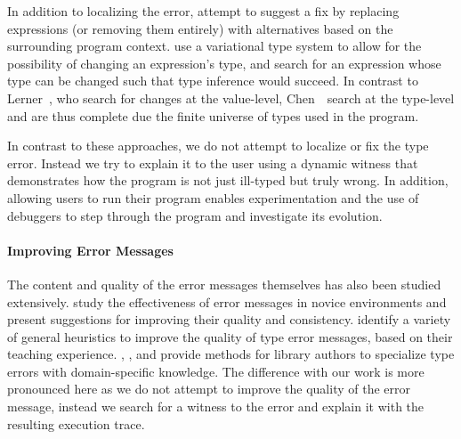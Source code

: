 In addition to localizing the error, \citet{Lerner2007-dt} attempt to
suggest a fix by replacing expressions (or removing them entirely) with
alternatives based on the surrounding program context.
%
\citet{Chen2014-gd} use a variational type system to allow for the
possibility of changing an expression's type, and search for an
expression whose type can be changed such that type inference would
succeed.
%
%
In contrast to Lerner~\etal, who search for changes at the value-level,
Chen~\etal\ search at the type-level and are thus complete due the finite
universe of types used in the program.
%
%

In contrast to these approaches, we do not attempt to localize or fix
the type error. Instead we try to explain it to the user using a
dynamic witness that demonstrates how the program is not just
ill-typed but truly wrong. In addition, allowing users to run their
program %
enables experimentation and the
use of debuggers to step through the program and investigate its
evolution.

\paragraph{Improving Error Messages}
The content and quality of the error messages themselves has also been
studied extensively.
%
\citet{Marceau2011-ok,Marceau2011-cy} study the effectiveness of error
messages in novice environments and present suggestions for improving
their quality and consistency.
%
\citet{Hage2006-hc} identify a variety of general heuristics to improve
the quality of type error messages, based on their teaching experience.
%
\citet{Heeren2003-db}, \citet{Christiansen2014-qc}, and
\citet{Serrano2016-oo} provide methods for library authors to specialize
type errors with domain-specific knowledge.
%
The difference with our work is more pronounced here as we do not
attempt to improve the quality of the error message, instead we search
for a witness to the error and explain it with the resulting execution
trace.

